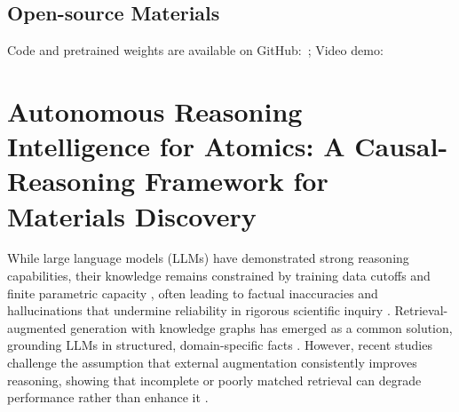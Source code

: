 \subsection*{Open-source Materials}
Code and pretrained weights are available on GitHub: \,; Video demo: 







\section{Autonomous Reasoning Intelligence for Atomics: A Causal-Reasoning Framework for Materials Discovery}

While large language models (LLMs) have demonstrated strong reasoning capabilities, their knowledge remains constrained by training data cutoffs and finite parametric capacity \cite{brown2020language}, often leading to factual inaccuracies and hallucinations that undermine reliability in rigorous scientific inquiry \cite{li-etal-2024-dawn}. Retrieval-augmented generation with knowledge graphs has emerged as a common solution, grounding LLMs in structured, domain-specific facts \cite{amayuelas2025groundingllmreasoningknowledge}. However, recent studies challenge the assumption that external augmentation consistently improves reasoning, showing that incomplete or poorly matched retrieval can degrade performance rather than enhance it \cite{yoran2024making}.

